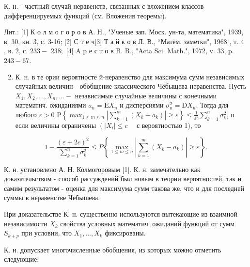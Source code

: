 \documentclass[10pt]{article}
\begin{document}
К. н. - частный случай неравенств, связанных с вложением классов дифференцируемых функций (см. Вложения теоремы).



Лит.: [1] К о л м о г о р о в А. Н., "Ученые зап. Моск. ун-та, математика", 1939, в. 30, кн. 3, с. 3-16; [2] С т е ч[3] Т а й к о в Л. В., “Матем. заметки", 1968 , т. 4 , в. 2, с. $233-$ $238 ;$ [4] A p е с т о в B. B., "Acta Sci. Math.", 1972, v. 33, p. $243-67$.



\begin{enumerate}

  \setcounter{enumi}{1}

  \item К. н. в те ории вероятносте й-неравенство для максимума сумм независимых случайных величин - обобщение классического Чебыщева неравенства. Пусть $X_{1}, X_{2}, \ldots, X_{n}, \ldots-$ независимые случайные величины с конечными математич. ожиданиями $a_{n}=\mathrm{E} X_{n}$ и дисперсиями $\sigma_{n}^{2}=\mathrm{D} X_{n}$. Тогда для любого $\varepsilon>0$ $\mathrm{P}\left\{\max _{1 \leqslant m \leqslant n}\left|\sum_{k=1}^{m}\left(X_{k}-a_{k}\right)\right| \geqslant \varepsilon\right\} \leqslant \frac{1}{\varepsilon^{2}} \sum_{k=1}^{n} \sigma_{k}^{2}$, п если величины ограничены $\left(\left|X_{i}\right| \leqslant c \quad\right.$ с вероятностью 1), то

\end{enumerate}



\[

1-\frac{(\varepsilon+2 c)^{2}}{\sum_{k=1}^{n} \sigma_{k}^{2}} \leqslant P\left\{\max _{1 \leqslant m \leqslant n}\left|\sum_{k=1}^{m}\left(X_{k}-a_{k}\right)\right| \geqslant \varepsilon\right\} .

\]



К. н. установлено А. Н. Колмогоровым [1]. К. н. замечательно как доказательством - способ рассуждений был новым в теории вероятностей, так и самим результатом - оценка для максимума сумм такова же, что и для последней суммы в неравенстве Чебышева.



При доказательстве К. н. существенно используются вытекающие из взаимной независимости $X_{k}$ свойства условных математич. ожиданий функций от сумм $S_{k+p}$ при условии, что $X_{1}, \ldots, X_{k}$ фиксированы.



К. н. допускает многочисленные обобщения, из которых можно отметить следующие:
\end{document}
